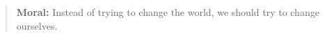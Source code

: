 \documentclass[oneside,12pt]{article}
\begin{document}
\begin{quote}
\textbf{Moral:} Instead of trying to change the world, we should try to change ourselves.
\end{quote}


%
%
%
%
%
%
%
%
%
%
\end{document}
